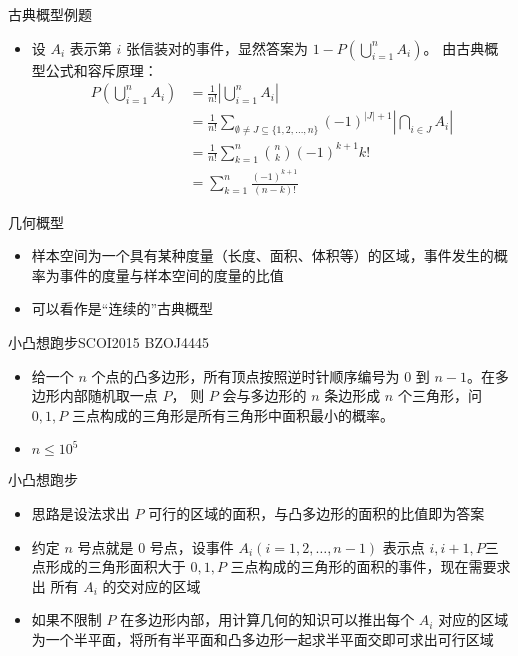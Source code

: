 \documentclass{beamer}
\begin{document}
    \begin{frame}{古典概型例题}
        \begin{itemize}
            \setlength{\itemsep}{10pt}
            \item 设 $A_i$ 表示第 $i$ 张信装对的事件，显然答案为 $1-P\left(\bigcup_{i=1}^{n}A_i\right)$。
            由古典概型公式和容斥原理：
            \begin{align*}
                P\left(\bigcup_{i=1}^{n}A_i\right)
                &= \frac{1}{n!} \left \lvert \bigcup_{i=1}^{n}A_i \right \rvert \\
                &= \frac{1}{n!} \sum_{\emptyset \ne J \subseteq \{1,2,\dots,n\}} (-1)^{\lvert J \rvert + 1} \left \lvert \bigcap_{i\in J} A_i \right \rvert \\
                &= \frac{1}{n!} \sum_{k=1}^{n} \binom{n}{k} (-1)^{k+1} k! \\
                &= \sum_{k=1}^{n} \frac{(-1)^{k+1}}{(n-k)!}
            \end{align*}
        \end{itemize}
    \end{frame}

    \begin{frame}{几何概型}
        \begin{itemize}
            \setlength{\itemsep}{10pt}
            \item 样本空间为一个具有某种度量（长度、面积、体积等）的区域，事件发生的概率为事件的度量与样本空间的度量的比值
            \item 可以看作是“连续的”古典概型
        \end{itemize}
    \end{frame}

    \begin{frame}{小凸想跑步}{SCOI2015 BZOJ4445}
        \begin{itemize}
            \setlength{\itemsep}{10pt}
            \item 给一个 $n$ 个点的凸多边形，所有顶点按照逆时针顺序编号为 $0$ 到 $n-1$。在多边形内部随机取一点 $P$，
            则 $P$ 会与多边形的 $n$ 条边形成 $n$ 个三角形，问 $0,1,P$ 三点构成的三角形是所有三角形中面积最小的概率。
            \item $n \le 10^5$
        \end{itemize}
    \end{frame}

    \begin{frame}{小凸想跑步}
        \begin{itemize}
            \setlength{\itemsep}{10pt}
            \item 思路是设法求出 $P$ 可行的区域的面积，与凸多边形的面积的比值即为答案
            \item 约定 $n$ 号点就是 0 号点，设事件 $A_i(i=1,2,\dots,n-1)$ 表示点 $i,i+1,P$三点形成的三角形面积大于 $0,1,P$ 三点构成的三角形的面积的事件，现在需要求出
            所有 $A_i$ 的交对应的区域
            \item 如果不限制 $P$ 在多边形内部，用计算几何的知识可以推出每个 $A_i$ 对应的区域为一个半平面，将所有半平面和凸多边形一起求半平面交即可求出可行区域
        \end{itemize}
    \end{frame}
\end{document}
